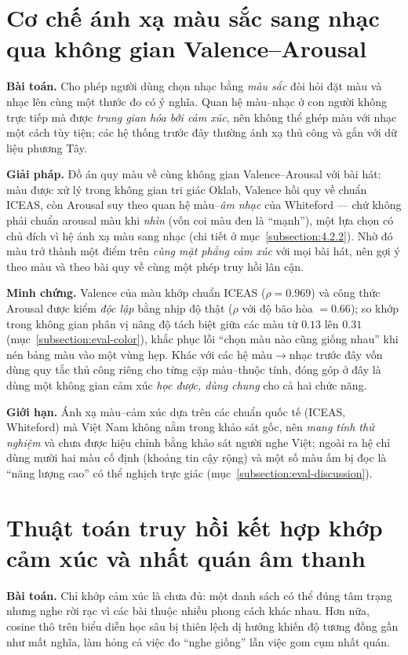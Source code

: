 \documentclass[../DoAn.tex]{subfiles}
\begin{document}
\section{Cơ chế ánh xạ màu sắc sang nhạc qua không gian Valence--Arousal}
\label{section:5.2}
\textbf{Bài toán.} Cho phép người dùng chọn nhạc bằng \textit{màu sắc} đòi hỏi đặt màu và nhạc lên cùng một thước đo có ý nghĩa. Quan hệ màu--nhạc ở con người không trực tiếp mà được \textit{trung gian hóa bởi cảm xúc}, nên không thể ghép màu với nhạc một cách tùy tiện; các hệ thống trước đây thường ánh xạ thủ công và gắn với dữ liệu phương Tây.

\textbf{Giải pháp.} Đồ án quy màu về cùng không gian Valence--Arousal với bài hát: màu được xử lý trong không gian tri giác Oklab, Valence hồi quy về chuẩn ICEAS, còn Arousal suy theo quan hệ màu--\textit{âm nhạc} của Whiteford --- chứ không phải chuẩn arousal màu khi \textit{nhìn} (vốn coi màu đen là ``mạnh''), một lựa chọn có chủ đích vì hệ ánh xạ màu sang nhạc (chi tiết ở mục~\ref{subsection:4.2.2}). Nhờ đó màu trở thành một điểm trên \textit{cùng mặt phẳng cảm xúc} với mọi bài hát, nên gợi ý theo màu và theo bài quy về cùng một phép truy hồi lân cận.

\textbf{Minh chứng.} Valence của màu khớp chuẩn ICEAS ($\rho = 0.969$) và công thức Arousal được kiểm \textit{độc lập} bằng nhịp độ thật ($\rho$ với độ bão hòa $= 0.66$); so khớp trong không gian phân vị nâng độ tách biệt giữa các màu từ $0.13$ lên $0.31$ (mục~\ref{subsection:eval-color}), khắc phục lỗi ``chọn màu nào cũng giống nhau'' khi nén bảng màu vào một vùng hẹp. Khác với các hệ màu$\rightarrow$nhạc trước đây vốn dùng quy tắc thủ công riêng cho từng cặp màu--thuộc tính, đóng góp ở đây là dùng một không gian cảm xúc \textit{học được, dùng chung} cho cả hai chức năng.

\textbf{Giới hạn.} Ánh xạ màu--cảm xúc dựa trên các chuẩn quốc tế (ICEAS, Whiteford) mà Việt Nam không nằm trong khảo sát gốc, nên \textit{mang tính thử nghiệm} và chưa được hiệu chỉnh bằng khảo sát người nghe Việt; ngoài ra hệ chỉ dùng mười hai màu cố định (khoảng tin cậy rộng) và một số màu ấm bị đọc là ``năng lượng cao'' có thể nghịch trực giác (mục~\ref{subsection:eval-discussion}).

\section{Thuật toán truy hồi kết hợp khớp cảm xúc và nhất quán âm thanh}
\label{section:5.3}
\textbf{Bài toán.} Chỉ khớp cảm xúc là chưa đủ: một danh sách có thể đúng tâm trạng nhưng nghe rời rạc vì các bài thuộc nhiều phong cách khác nhau. Hơn nữa, cosine thô trên biểu diễn học sâu bị thiên lệch dị hướng khiến độ tương đồng gần như mất nghĩa, làm hỏng cả việc đo ``nghe giống'' lẫn việc gom cụm nhất quán.
\end{document}
